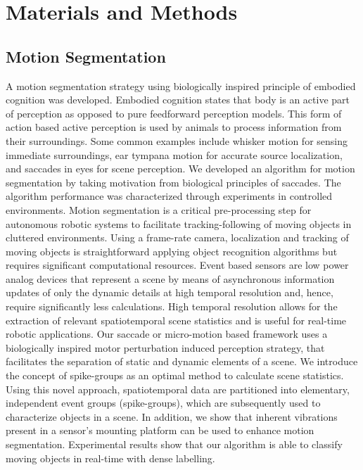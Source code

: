 \chapter{Materials and Methods}

 \section{Motion Segmentation }
 A motion segmentation strategy using biologically inspired principle of embodied cognition was developed. Embodied cognition states that body is an active part of perception as opposed to pure feedforward perception models. This form of action based active perception is used by animals to process information from their surroundings. Some common examples include whisker motion for sensing immediate surroundings, ear tympana motion for accurate source localization, and saccades in eyes for scene perception. We developed an algorithm for motion segmentation by taking motivation from biological principles of saccades. The algorithm performance was characterized through experiments in controlled environments.
Motion segmentation is a critical pre-processing step for autonomous robotic systems to facilitate tracking-following of moving objects in cluttered environments. Using a frame-rate camera, localization and tracking of moving objects is straightforward applying object recognition algorithms but requires significant computational resources. Event based sensors are low power analog devices that represent a scene by means of asynchronous information updates of only the dynamic details at high temporal resolution and, hence, require significantly less calculations. High temporal resolution allows for the extraction of relevant spatiotemporal scene statistics and is useful for real-time robotic applications. Our saccade or micro-motion based framework uses a biologically inspired motor perturbation induced perception strategy, that facilitates the separation of static and dynamic elements of a scene. We introduce the concept of spike-groups as an optimal method to calculate scene statistics. Using this novel approach, spatiotemporal data are partitioned into elementary, independent event groups (spike-groups), which are subsequently used to characterize objects in a scene. In addition, we show that inherent vibrations present in a sensor’s mounting platform can be used to enhance motion segmentation. Experimental results show that our algorithm is able to classify moving objects in real-time with dense labelling.


